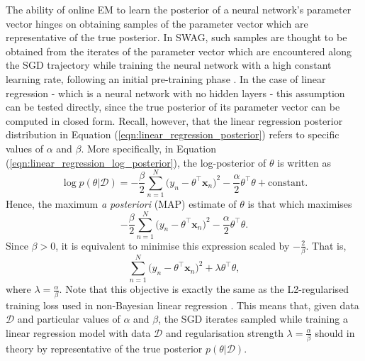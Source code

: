 \documentclass[msc,deptreport.inf]{infthesis} %
\newcommand{\matr}[1]{\mathbf{#1}}
\begin{document}
The ability of online EM to learn the posterior of a neural network's parameter vector hinges on obtaining samples of the parameter vector which are representative of the true posterior. In SWAG, such samples are thought to be obtained from the iterates of the parameter vector which are encountered along the SGD trajectory while training the neural network with a high constant learning rate, following an initial pre-training phase \cite{maddox2019}. In the case of linear regression - which is a neural network with no hidden layers - this assumption can be tested directly, since the true posterior of its parameter vector can be computed in closed form. Recall, however, that the linear regression posterior distribution in Equation (\ref{eqn:linear_regression_posterior}) refers to specific values of $\alpha$ and $\beta$. More specifically, in Equation (\ref{eqn:linear_regression_log_posterior}), the log-posterior of $\theta$ is written as 
\begin{equation}
	\log p(\theta | \mathcal{D}) 
	= -\frac{\beta}{2} \sum_{n=1}^N \big(y_n - \theta^\intercal \matr{x}_n \big)^2 
	-\frac{\alpha}{2} \theta^\intercal \theta 
	+ \text{constant}.
\end{equation}
Hence, the maximum \emph{a posteriori} (MAP) estimate of $\theta$ is that which maximises
\begin{equation}
	-\frac{\beta}{2} \sum_{n=1}^N \big(y_n - \theta^\intercal \matr{x}_n \big)^2 
	-\frac{\alpha}{2} \theta^\intercal \theta.
\end{equation}
Since $\beta > 0$, it is equivalent to minimise this expression scaled by $-\frac{2}{\beta}$. That is,
\begin{equation}
	\sum_{n=1}^N \big(y_n - \theta^\intercal \matr{x}_n \big)^2 
	+ \lambda \theta^\intercal \theta,
\end{equation}
where $\lambda = \frac{\alpha}{\beta}$. Note that this objective is exactly the same as the L2-regularised training loss used in non-Bayesian linear regression \cite{barber2007}. This means that, given data $\mathcal{D}$ and particular values of $\alpha$ and $\beta$, the SGD iterates sampled while training a linear regression model with data $\mathcal{D}$ and regularisation strength $\lambda = \frac{\alpha}{\beta}$ should in theory by representative of the true posterior $p(\theta | \mathcal{D})$.
\end{document}
